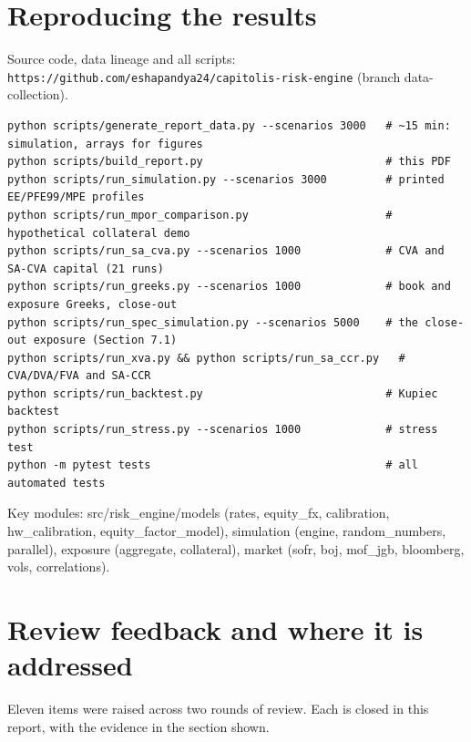 \documentclass[11pt,letterpaper]{article}
\begin{document}
\section{Reproducing the results}
Source code, data lineage and all scripts: \texttt{https://github.com/eshapandya24/capitolis-risk-engine} (branch data-collection).

{\fontsize{7.2}{8.8}\selectfont
\begin{verbatim}
python scripts/generate_report_data.py --scenarios 3000   # ~15 min: simulation, arrays for figures
python scripts/build_report.py                            # this PDF
python scripts/run_simulation.py --scenarios 3000         # printed EE/PFE99/MPE profiles
python scripts/run_mpor_comparison.py                     # hypothetical collateral demo
python scripts/run_sa_cva.py --scenarios 1000             # CVA and SA-CVA capital (21 runs)
python scripts/run_greeks.py --scenarios 1000             # book and exposure Greeks, close-out
python scripts/run_spec_simulation.py --scenarios 5000    # the close-out exposure (Section 7.1)
python scripts/run_xva.py && python scripts/run_sa_ccr.py   # CVA/DVA/FVA and SA-CCR
python scripts/run_backtest.py                            # Kupiec backtest
python scripts/run_stress.py --scenarios 1000             # stress test
python -m pytest tests                                    # all automated tests
\end{verbatim}}
{\small Key modules: src/risk\_engine/models (rates, equity\_fx, calibration, hw\_calibration, equity\_factor\_model), simulation (engine, random\_numbers, parallel), exposure (aggregate, collateral), market (sofr, boj, mof\_jgb, bloomberg, vols, correlations).}

\section{Review feedback and where it is addressed}
Eleven items were raised across two rounds of review. Each is closed in this report, with the evidence in the section shown.
\end{document}
